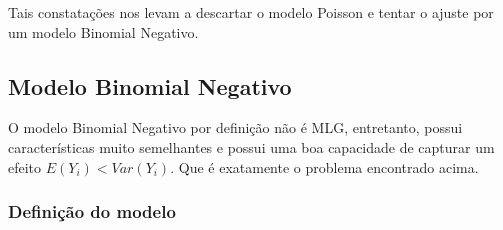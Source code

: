 \documentclass[12pt,a4paper]{article}\usepackage[]{graphicx}\usepackage[]{color}
\begin{document}
Tais constatações nos levam a descartar o modelo Poisson e tentar o ajuste por um modelo Binomial Negativo.


\subsection{\textbf{Modelo Binomial Negativo}}
O modelo Binomial Negativo por definição não é MLG, entretanto, possui características muito semelhantes e possui uma boa capacidade de capturar um efeito $E(Y_i)<Var(Y_i)$. Que é exatamente o problema encontrado acima.
\subsubsection{\textbf{Definição do modelo}}
\end{document}
